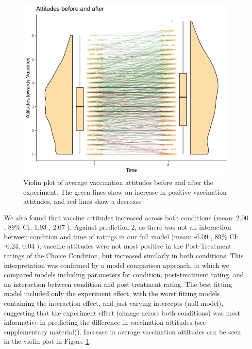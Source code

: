 \documentclass[
  english,
  ,jou,floatsintext]{apa6}
\begin{document}
\begin{figure}

{\centering \includegraphics[width=1\linewidth]{../plots/before_and_after_violin} 

}

\caption{Violin plot of average vaccination attitudes before and after the experiment. The green lines show an increase in positive vaccination attitudes, and red lines show a decrease}\label{fig:beforeafter}
\end{figure}

We also found that vaccine attitudes increased across both conditions (mean: 2.00 , 89\% CI: 1.93 , 2.07 ). Against prediction 2, as there was not an interaction between condition and time of ratings in our full model (mean: -0.09 , 89\% CI: -0.24, 0.04 ); vaccine attitudes were not most positive in the Post-Treatment ratings of the Choice Condition, but increased similarly in both conditions. This interpretation was confirmed by a model comparison approach, in which we compared models including parameters for condition, post-treatment rating, and an interaction between condition and post-treatment rating. The best fitting model included only the experiment effect, with the worst fitting models containing the interaction effect, and just varying intercepts (null model), suggesting that the experiment effect (change across both conditions) was most informative in predicting the difference in vaccination attitudes (see supplementary material)). Increase in average vaccination attitudes can be seen in the violin plot in Figure \ref{fig:beforeafter}.
\end{document}
